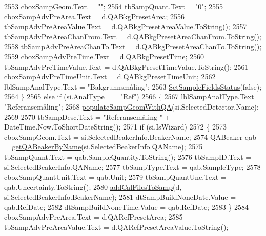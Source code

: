 \begin{DoxyCode}
2553                 cboxSampGeom.Text = \textcolor{stringliteral}{""};
2554                 tbSampQuant.Text = \textcolor{stringliteral}{"0"};
2555                 cboxSampAdvPreArea.Text = d.QABkgPresetArea;
2556                 tbSampAdvPreAreaValue.Text = d.QABkgPresetAreaValue.ToString();
2557                 tbSampAdvPreAreaChanFrom.Text = d.QABkgPresetAreaChanFrom.ToString();
2558                 tbSampAdvPreAreaChanTo.Text = d.QABkgPresetAreaChanTo.ToString();
2559                 cboxSampAdvPreTime.Text = d.QABkgPresetTime;
2560                 tbSampAdvPreTimeValue.Text = d.QABkgPresetTimeValue.ToString();
2561                 cboxSampAdvPreTimeUnit.Text = d.QABkgPresetTimeUnit;
2562                 lblSampAnalType.Text = \textcolor{stringliteral}{"Bakgrunnsmåling"};
2563                 \hyperlink{class_scintilab_1_1_form_main_ad85e690e8d5fa96cbf9c0a7632bd7140}{SetSampleFieldsStatus}(\textcolor{keyword}{false});
2564             \}
2565             \textcolor{keywordflow}{else} \textcolor{keywordflow}{if} (si.AnalType == \textcolor{stringliteral}{"Ref"})
2566             \{
2567                 lblSampAnalType.Text = \textcolor{stringliteral}{"Referansemåling"};
2568                 \hyperlink{class_scintilab_1_1_form_main_a2d2ec0fa77e4dd0a81bb186b8021b210}{populateSampGeomWithQA}(si.SelectedDetector.Name);
2569 
2570                 tbSampDesc.Text = \textcolor{stringliteral}{"Referansemåling "} + DateTime.Now.ToShortDateString();
2571                 \textcolor{keywordflow}{if} (si.IsWizard)
2572                 \{
2573                     cboxSampGeom.Text = si.SelectedBeakerInfo.BeakerName;
2574                     QABeaker qab = \hyperlink{class_scintilab_1_1_form_main_ae8b1f6bb6a734ec6ad54794d345ce650}{getQABeakerByName}(si.SelectedBeakerInfo.QAName);
2575                     tbSampQuant.Text = qab.SampleQuantity.ToString();
2576                     tbSampID.Text = si.SelectedBeakerInfo.QAName;
2577                     tbSampType.Text = qab.SampleType;
2578                     cboxSampQuantUnit.Text = qab.Unit;
2579                     tbSampQuantUnc.Text = qab.Uncertainty.ToString();
2580                     \hyperlink{class_scintilab_1_1_form_main_ab744904cac6a4bf90ebbe326b658e2e5}{addCalFilesToSamp}(d, si.SelectedBeakerInfo.BeakerName);
2581                     dtSampBuildNoneDate.Value = qab.RefDate;
2582                     dtSampBuildNoneTime.Value = qab.RefDate;
2583                 \}
2584                 cboxSampAdvPreArea.Text = d.QARefPresetArea;
2585                 tbSampAdvPreAreaValue.Text = d.QARefPresetAreaValue.ToString();

\end{DoxyCode}
